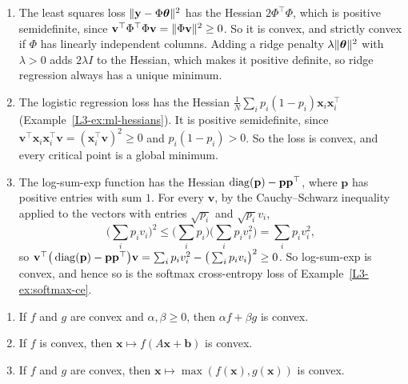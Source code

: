 \begin{example}\label{L3-ex:convex-losses}
    \begin{enumerate}
        \item The least squares loss $\lVert \mathbf{y} - \Phi\boldsymbol{\theta} \rVert^2$ has the Hessian $2\Phi^\top\Phi$, which is positive semidefinite, since $\mathbf{v}^\top\Phi^\top\Phi\mathbf{v} = \lVert \Phi\mathbf{v} \rVert^2 \geq 0$. So it is convex, and strictly convex if $\Phi$ has linearly independent columns. Adding a ridge penalty $\lambda\lVert \boldsymbol{\theta} \rVert^2$ with $\lambda > 0$ adds $2\lambda I$ to the Hessian, which makes it positive definite, so ridge regression always has a unique minimum.
        \item The logistic regression loss has the Hessian $\frac{1}{N}\sum_i p_i(1 - p_i)\mathbf{x}_i\mathbf{x}_i^\top$ (Example~\ref{L3-ex:ml-hessians}). It is positive semidefinite, since $\mathbf{v}^\top\mathbf{x}_i\mathbf{x}_i^\top\mathbf{v} = (\mathbf{x}_i^\top\mathbf{v})^2 \geq 0$ and $p_i(1 - p_i) > 0$. So the loss is convex, and every critical point is a global minimum.
        \item The log-sum-exp function has the Hessian $\operatorname{diag}(\mathbf{p}) - \mathbf{p}\mathbf{p}^\top$, where $\mathbf{p}$ has positive entries with sum $1$. For every $\mathbf{v}$, by the Cauchy--Schwarz inequality applied to the vectors with entries $\sqrt{p_i}$ and $\sqrt{p_i}v_i$,
        \[\Big(\sum_i p_i v_i\Big)^2 \leq \Big(\sum_i p_i\Big)\Big(\sum_i p_i v_i^2\Big) = \sum_i p_i v_i^2,\]
        so $\mathbf{v}^\top\big(\operatorname{diag}(\mathbf{p}) - \mathbf{p}\mathbf{p}^\top\big)\mathbf{v} = \sum_i p_i v_i^2 - \big(\sum_i p_i v_i\big)^2 \geq 0$.
        So log-sum-exp is convex, and hence so is the softmax cross-entropy loss of Example~\ref{L3-ex:softmax-ce}.
    \end{enumerate}
\end{example}

\begin{proposition}\label{L3-prop:convex-operations}
    \begin{enumerate}
        \item If $f$ and $g$ are convex and $\alpha, \beta \geq 0$, then $\alpha f + \beta g$ is convex.
        \item If $f$ is convex, then $\mathbf{x} \mapsto f(A\mathbf{x} + \mathbf{b})$ is convex.
        \item If $f$ and $g$ are convex, then $\mathbf{x} \mapsto \max(f(\mathbf{x}), g(\mathbf{x}))$ is convex.
    \end{enumerate}
\end{proposition}

